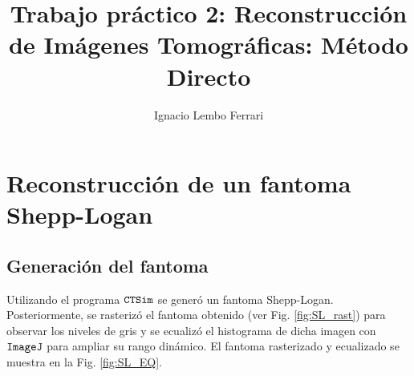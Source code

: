 \documentclass[letterpaper,12pt]{article}
\title{Trabajo práctico 2: Reconstrucción de Imágenes Tomográficas: Método Directo} %
\author[1]{Ignacio Lembo Ferrari}
\affil[1]{Instituto Balseiro}
\date{\vspace{-4ex}}
\theoremstyle{plain}
\begin{document}
\maketitle

\section{Reconstrucción de un fantoma Shepp-Logan}

\subsection{Generación del fantoma}

Utilizando el programa $\verb|CTSim|$ se generó un fantoma Shepp-Logan. Posteriormente, se rasterizó el fantoma obtenido (ver Fig. \ref{fig:SL_rast}) para observar los niveles de gris y se ecualizó el histograma de dicha imagen con $\verb|ImageJ|$ para ampliar su rango dinámico. El fantoma rasterizado y ecualizado se muestra en la Fig. \ref{fig:SL_EQ}.  
\end{document}

